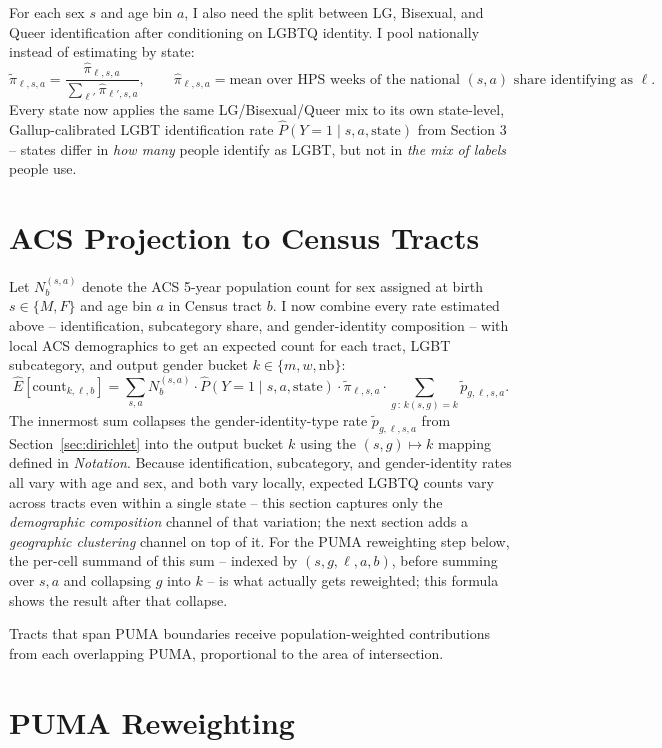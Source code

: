 \documentclass[11pt]{article}
\begin{document}
For each sex $s$ and age bin $a$, I also need the split between LG, Bisexual, and Queer identification after conditioning on LGBTQ identity. I pool nationally instead of estimating by state:
\[
\tilde\pi_{\ell,s,a}
=
\frac{\hat\pi_{\ell,s,a}}{\sum_{\ell'} \hat\pi_{\ell',s,a}},
\qquad
\hat\pi_{\ell,s,a} = \text{mean over HPS weeks of the national }
(s,a)\text{ share identifying as } \ell.
\]
Every state now applies the same LG/Bisexual/Queer mix to its own
state-level, Gallup-calibrated LGBT identification rate $\widehat
P(Y=1\mid s,a,\text{state})$ from Section 3 -- states differ in \emph{how
many} people identify as LGBT, but not in \emph{the mix
of labels} people use.

\section{ACS Projection to Census Tracts}
\label{sec:acs}

Let $N_b^{(s,a)}$ denote the ACS 5-year population count for sex assigned
at birth $s \in \{M,F\}$ and age bin $a$ in Census tract $b$. I now combine
every rate estimated above -- identification, subcategory share, and
gender-identity composition -- with local ACS demographics to get an
expected count for each tract, LGBT subcategory, and output gender bucket
$k \in \{m, w, \text{nb}\}$:
\[
\hat{E}[\text{count}_{k,\ell,b}]
=
\sum_{s,a} N_b^{(s,a)}
\cdot \widehat{P}(Y=1 \mid s,a,\text{state})
\cdot \tilde\pi_{\ell,s,a}
\cdot \!\!\sum_{g\,:\,k(s,g)=k}\!\! \tilde p_{g,\ell,s,a}.
\]
The innermost sum collapses the gender-identity-type rate $\tilde
p_{g,\ell,s,a}$ from Section~\ref{sec:dirichlet} into the output bucket $k$
using the $(s,g)\mapsto k$ mapping defined in \emph{Notation}. Because
identification, subcategory, and gender-identity rates all vary with age
and sex, and both vary locally, expected LGBTQ counts vary across tracts
even within a single state -- this section captures only the
\emph{demographic composition} channel of that variation; the next section
adds a \emph{geographic clustering} channel on top of it. For the PUMA
reweighting step below, the per-cell summand of this sum -- indexed by
$(s,g,\ell,a,b)$, before summing over $s,a$ and collapsing $g$ into $k$ --
is what actually gets reweighted; this formula shows the result after that
collapse.

Tracts that span PUMA boundaries receive population-weighted contributions
from each overlapping PUMA, proportional to the area of intersection.

\section{PUMA Reweighting}
\end{document}
